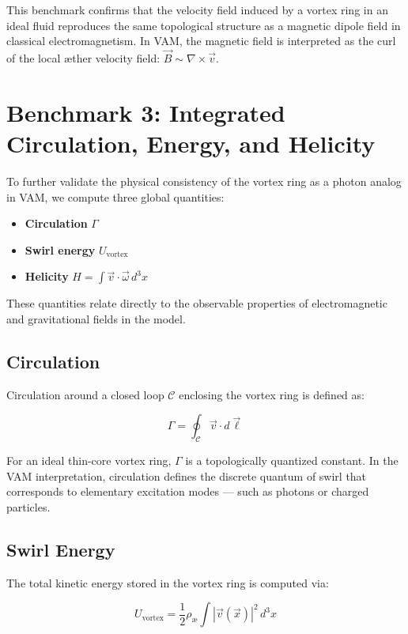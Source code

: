\documentclass[preprint]{revtex4-2}
\begin{document}
This benchmark confirms that the velocity field induced by a vortex ring in an ideal fluid reproduces the same topological structure as a magnetic dipole field in classical electromagnetism. In VAM, the magnetic field is interpreted as the curl of the local æther velocity field: $\vec{B} \sim \nabla \times \vec{v}$.


\section{Benchmark 3: Integrated Circulation, Energy, and Helicity}

To further validate the physical consistency of the vortex ring as a photon analog in VAM, we compute three global quantities:

\begin{itemize}
    \item \textbf{Circulation} $\Gamma$
    \item \textbf{Swirl energy} $U_{\text{vortex}}$
    \item \textbf{Helicity} $H = \int \vec{v} \cdot \vec{\omega} \, d^3x$
\end{itemize}

These quantities relate directly to the observable properties of electromagnetic and gravitational fields in the model.

\subsection{Circulation}

Circulation around a closed loop $\mathcal{C}$ enclosing the vortex ring is defined as:

\begin{equation}
\Gamma = \oint_{\mathcal{C}} \vec{v} \cdot d\vec{\ell}
\end{equation}

For an ideal thin-core vortex ring, $\Gamma$ is a topologically quantized constant. In the VAM interpretation, circulation defines the discrete quantum of swirl that corresponds to elementary excitation modes — such as photons or charged particles.

\subsection{Swirl Energy}

The total kinetic energy stored in the vortex ring is computed via:

\begin{equation}
U_{\text{vortex}} = \frac{1}{2} \rho_{\text{\ae}} \int |\vec{v}(\vec{x})|^2 \, d^3x
\end{equation}
\end{document}
